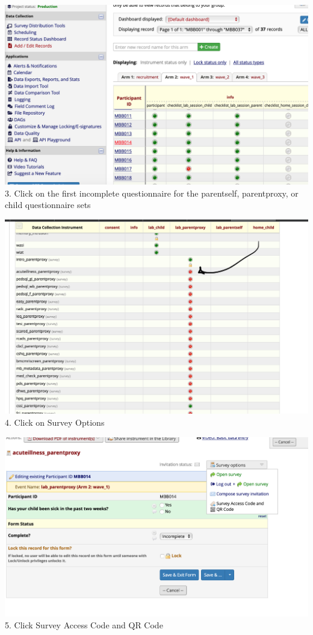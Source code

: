 \documentclass[]{book}
\begin{document}
\includegraphics{images/redcap_code/2.png}
3. Click on the first incomplete questionnaire for the parentself, parentproxy, or child questionnaire sets

\includegraphics{images/redcap_code/3.png}
4. Click on Survey Options

\includegraphics{images/redcap_code/4.png}
5. Click Survey Access Code and QR Code
\end{document}
